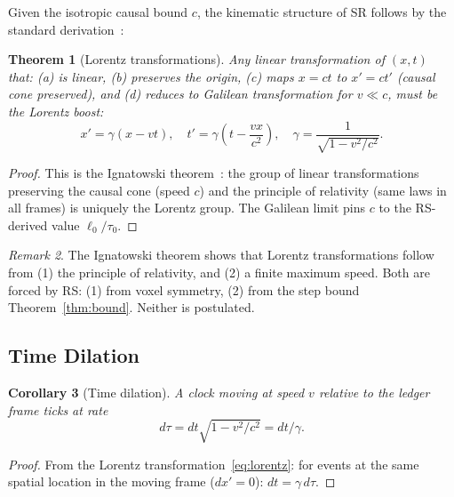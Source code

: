 \documentclass[12pt,a4paper]{article}
\newtheorem{theorem}{Theorem}[section]
\newtheorem{corollary}[theorem]{Corollary}
\theoremstyle{definition}
\theoremstyle{remark}
\newtheorem{remark}[theorem]{Remark}
\begin{document}
Given the isotropic causal bound $c$, the kinematic structure of SR
follows by the standard derivation~\cite{Mermin1984}:

\begin{theorem}[Lorentz transformations]\label{thm:lorentz}
Any linear transformation of $(x, t)$ that:
(a) is linear, (b) preserves the origin, (c) maps $x = ct$ to $x' = ct'$
(causal cone preserved), and (d) reduces to Galilean transformation for
$v \ll c$, must be the Lorentz boost:
\begin{equation}
  x' = \gamma(x - vt), \quad t' = \gamma\!\left(t - \frac{vx}{c^2}\right),
  \quad \gamma = \frac{1}{\sqrt{1 - v^2/c^2}}.
  \label{eq:lorentz}
\end{equation}
\end{theorem}

\begin{proof}
This is the Ignatowski theorem~\cite{Ignatowski1910}: the group of linear
transformations preserving the causal cone (speed $c$) and the principle
of relativity (same laws in all frames) is uniquely the Lorentz group.
The Galilean limit pins $c$ to the RS-derived value $\ell_0/\tau_0$.
\end{proof}

\begin{remark}
The Ignatowski theorem shows that Lorentz transformations follow from
(1) the principle of relativity, and (2) a finite maximum speed.
Both are forced by RS: (1) from voxel symmetry, (2) from the step bound
Theorem~\ref{thm:bound}.  Neither is postulated.
\end{remark}

\subsection{Time Dilation}

\begin{corollary}[Time dilation]\label{cor:td}
A clock moving at speed $v$ relative to the ledger frame ticks at rate
\begin{equation}
  d\tau = dt\sqrt{1 - v^2/c^2} = dt/\gamma.
\end{equation}
\end{corollary}

\begin{proof}
From the Lorentz transformation~\eqref{eq:lorentz}: for events at the
same spatial location in the moving frame ($dx' = 0$):
$dt = \gamma\,d\tau$.
\end{proof}
\end{document}
